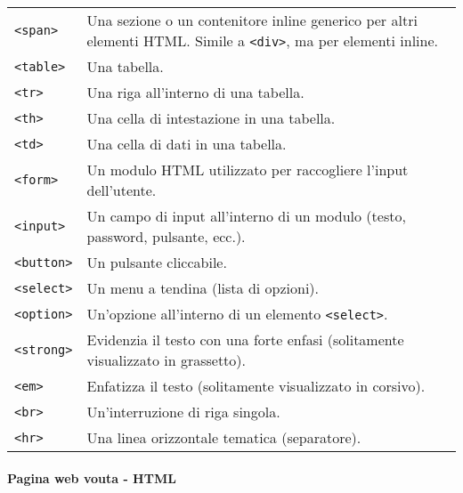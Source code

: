 \documentclass[
]{article}
\begin{document}
\begin{longtable}[]{@{}
  >{\raggedright\arraybackslash}p{}
  >{\raggedright\arraybackslash}p{}@{}}
\texttt{\textless{}span\textgreater{}} & Una sezione o un contenitore
inline generico per altri elementi HTML. Simile a
\texttt{\textless{}div\textgreater{}}, ma per elementi inline. \\
\texttt{\textless{}table\textgreater{}} & Una tabella. \\
\texttt{\textless{}tr\textgreater{}} & Una riga all'interno di una
tabella. \\
\texttt{\textless{}th\textgreater{}} & Una cella di intestazione in una
tabella. \\
\texttt{\textless{}td\textgreater{}} & Una cella di dati in una
tabella. \\
\texttt{\textless{}form\textgreater{}} & Un modulo HTML utilizzato per
raccogliere l'input dell'utente. \\
\texttt{\textless{}input\textgreater{}} & Un campo di input all'interno
di un modulo (testo, password, pulsante, ecc.). \\
\texttt{\textless{}button\textgreater{}} & Un pulsante cliccabile. \\
\texttt{\textless{}select\textgreater{}} & Un menu a tendina (lista di
opzioni). \\
\texttt{\textless{}option\textgreater{}} & Un'opzione all'interno di un
elemento \texttt{\textless{}select\textgreater{}}. \\
\texttt{\textless{}strong\textgreater{}} & Evidenzia il testo con una
forte enfasi (solitamente visualizzato in grassetto). \\
\texttt{\textless{}em\textgreater{}} & Enfatizza il testo (solitamente
visualizzato in corsivo). \\
\texttt{\textless{}br\textgreater{}} & Un'interruzione di riga
singola. \\
\texttt{\textless{}hr\textgreater{}} & Una linea orizzontale tematica
(separatore). \\
\end{longtable}

\paragraph{Pagina web vouta - HTML}\label{pagina-web-vouta---html}
\end{document}
